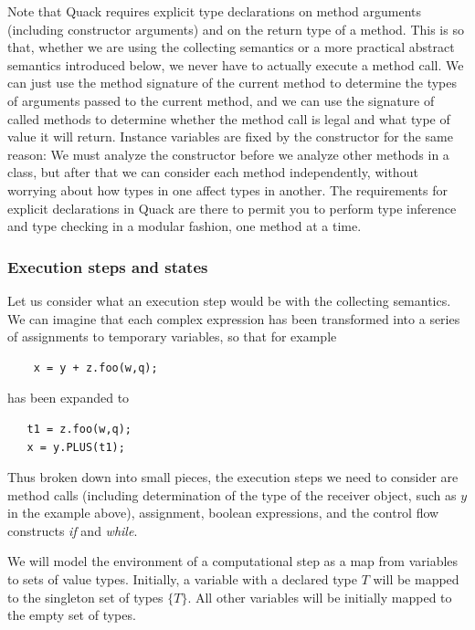 \documentclass[11pt]{article}
\begin{document}
Note that Quack requires explicit type declarations on method
arguments (including constructor arguments) and on the return type of
a method.  This is so that, whether we are using the collecting
semantics or a more practical abstract semantics introduced below, we
never have to actually execute a method call.  We can just use the
method signature of the current method to determine the types of
arguments passed to the current method, and we can use the signature
of called methods to determine whether the method call is legal and 
what type of value it will return.  Instance variables are fixed by
the constructor for the same reason:  We must analyze the constructor
before we analyze other methods in a class, but after that we can
consider each method independently, without worrying about how types
in one affect types in another.    The requirements for explicit
declarations in Quack are there to permit you to perform type
inference and type checking in a modular fashion, one method at a
time. 

\subsubsection{Execution steps and states}

Let us consider what an execution step would be with the collecting
semantics.  We can imagine that each complex expression has been
transformed into a series of assignments to temporary variables, so
that for example 
\begin{verbatim}
    x = y + z.foo(w,q);
\end{verbatim}

\noindent has been expanded to 

\begin{verbatim}
   t1 = z.foo(w,q);
   x = y.PLUS(t1);
\end{verbatim}

Thus broken down into small pieces, the execution steps we need to
consider are method calls (including determination of the type of the
receiver object, such as $y$ in the example above), assignment,
boolean expressions, and the control flow constructs \emph{if} and
\emph{while}. 

We will model the environment of a computational step as a map from
variables to sets of value types.  Initially, a variable with a
declared type $T$ will be mapped to the singleton set of types 
\(\{ T \}\).  All other variables will be initially mapped to the
empty set of types. 
\end{document}
